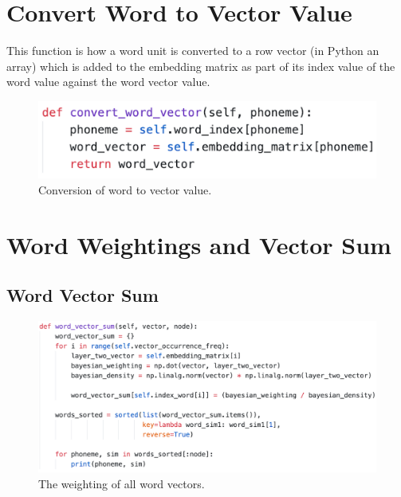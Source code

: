 \section{Convert Word to Vector Value}

This function is how a word unit is converted to a row vector (in Python an array) which is added to the embedding matrix as part of its index value of the word value against the word vector value.

\begin{figure}[H]
    \centering
    \includegraphics[width=\textwidth]{figures/chapter-6/convertwordvector.png}
    \caption[Conversion of word to vector value]{Conversion of word to vector value.
    \label{fig:convertwordvector}}
\end{figure}

\section{Word Weightings and Vector Sum}

\subsection{Word Vector Sum}

\begin{figure}[H]
    \centering
    \includegraphics[width=\textwidth]{figures/chapter-6/wordvectorsum.png}
    \caption[The weighting of all word vectors]{The weighting of all word vectors.
    \label{fig:wordvectorsum}}
\end{figure}

